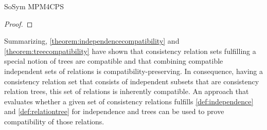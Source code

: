 \begin{copiedFrom}{SoSym MPM4CPS}
\begin{proof}
    
\end{proof}

Summarizing, \autoref{theorem:independencecompatibility} and \autoref{theorem:treecompatibility} have shown that consistency relation sets fulfilling a special notion of trees are compatible and that combining compatible independent sets of relations is compatibility-preserving.
In consequence, having a consistency relation set that consists of independent subsets that are consistency relation trees, this set of relations is inherently compatible.
An approach that evaluates whether a given set of consistency relations fulfills \autoref{def:independence} and \autoref{def:relationtree} for independence and trees can be used to prove compatibility of those relations.


\end{copiedFrom}
